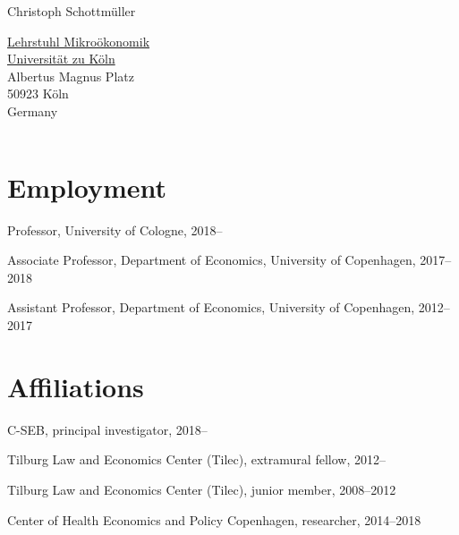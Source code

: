 \documentclass[a4paper]{article}
\def\name{Christoph Schottm\"uller}
\renewenvironment{itemize}{
  \begin{list}{}{
    \setlength{\leftmargin}{1.5em}
  }
}{
  \end{list}
}
\begin{document}
{\huge \name}


\vspace{0.25in}

\begin{minipage}{0.45\linewidth}
  \href{https://schottmueller.github.io/}{Lehrstuhl Mikro\"okonomik} \\
  \href{https://www.wiso.uni-koeln.de/en/en}{Universität zu Köln} \\
  Albertus Magnus Platz\\
  50923 K\"oln\\Germany
\end{minipage}
\hspace*{-.5cm} %
\begin{minipage}{0.45\linewidth}
  \begin{tabular}{ll} 
  \end{tabular}
\end{minipage}


\section*{Employment}

\begin{itemize}
\item Professor, University of Cologne, 2018--
  \item Associate Professor, Department of Economics, University of Copenhagen, 2017--2018
\item Assistant Professor, Department of Economics, University of Copenhagen, 2012--2017
\end{itemize}

\section*{Affiliations}
\begin{itemize}
\item C-SEB, principal investigator, 2018--
\item Tilburg Law and Economics Center (Tilec), extramural fellow, 2012--
\item Tilburg Law and Economics Center (Tilec), junior member, 2008--2012
\item Center of Health Economics and Policy Copenhagen, researcher, 2014--2018
\end{itemize}
\end{document}
